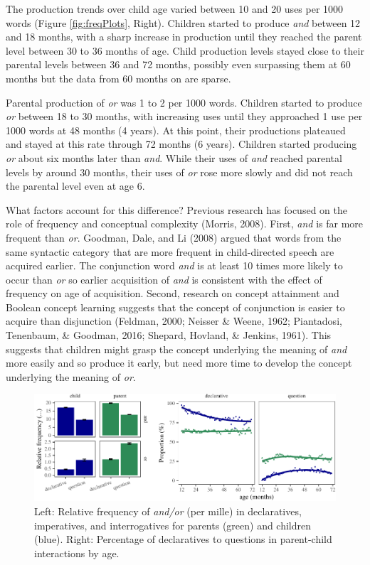 \documentclass[
  ,man,floatsintext]{apa6}
\begin{document}
The production trends over child age varied between 10 and 20 uses per 1000 words (Figure \ref{fig:freqPlots}, Right). Children started to produce \emph{and} between 12 and 18 months, with a sharp increase in production until they reached the parent level between 30 to 36 months of age. Child production levels stayed close to their parental levels between 36 and 72 months, possibly even surpassing them at 60 months but the data from 60 months on are sparse.

Parental production of \emph{or} was 1 to 2 per 1000 words. Children started to produce \emph{or} between 18 to 30 months, with increasing uses until they approached 1 use per 1000 words at 48 months (4 years). At this point, their productions plateaued and stayed at this rate through 72 months (6 years). Children started producing \emph{or} about six months later than \emph{and}. While their uses of \emph{and} reached parental levels by around 30 months, their uses of \emph{or} rose more slowly and did not reach the parental level even at age 6.

What factors account for this difference? Previous research has focused on the role of frequency and conceptual complexity (Morris, 2008). First, \emph{and} is far more frequent than \emph{or}. Goodman, Dale, and Li (2008) argued that words from the same syntactic category that are more frequent in child-directed speech are acquired earlier. The conjunction word \emph{and} is at least 10 times more likely to occur than \emph{or} so earlier acquisition of \emph{and} is consistent with the effect of frequency on age of acquisition. Second, research on concept attainment and Boolean concept learning suggests that the concept of conjunction is easier to acquire than disjunction (Feldman, 2000; Neisser \& Weene, 1962; Piantadosi, Tenenbaum, \& Goodman, 2016; Shepard, Hovland, \& Jenkins, 1961). This suggests that children might grasp the concept underlying the meaning of \emph{and} more easily and so produce it early, but need more time to develop the concept underlying the meaning of \emph{or}.

\begin{figure}[H]

{\centering \includegraphics{figs/speechActPlots-1} 

}

\caption{Left: Relative frequency of \textit{and/or} (per mille) in declaratives, imperatives, and interrogatives for parents (green) and children (blue). Right: Percentage of declaratives to questions in parent-child interactions by age.}\label{fig:speechActPlots}
\end{figure}
\end{document}
